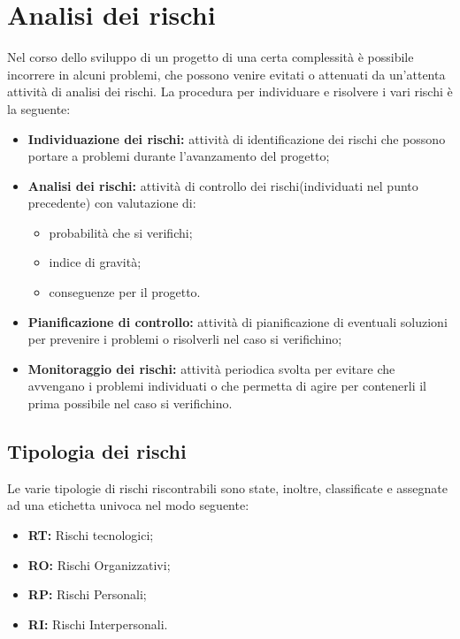 \section{Analisi dei rischi}

Nel corso dello sviluppo di un progetto di una certa complessità è possibile incorrere in alcuni problemi, che possono venire evitati o attenuati da un'attenta attività di analisi dei rischi. La procedura per individuare e risolvere i vari rischi è la seguente:
\begin{itemize}
\item \textbf{Individuazione dei rischi:} attività di identificazione dei rischi che possono portare a problemi durante l'avanzamento del progetto;
\item \textbf{Analisi dei rischi:} attività di controllo dei rischi(individuati nel punto precedente) con valutazione di:
\begin{itemize}
\item probabilità che si verifichi;
\item indice di gravità;
\item conseguenze per il progetto.
\end{itemize}
\item \textbf{Pianificazione di controllo:} attività di pianificazione di eventuali soluzioni per prevenire i problemi o risolverli nel caso si verifichino;
\item \textbf{Monitoraggio dei rischi:} attività periodica svolta per evitare che avvengano i problemi individuati o che permetta di agire per contenerli il prima possibile nel caso si verifichino.
\end{itemize}

\subsection{Tipologia dei rischi}
Le varie tipologie di rischi riscontrabili sono state, inoltre, classificate e assegnate ad una etichetta univoca nel modo seguente:
\begin{itemize}
\item \textbf{RT:} Rischi tecnologici;
\item \textbf{RO:} Rischi Organizzativi;
\item \textbf{RP:} Rischi Personali;
\item \textbf{RI:} Rischi Interpersonali.
\end{itemize} 

